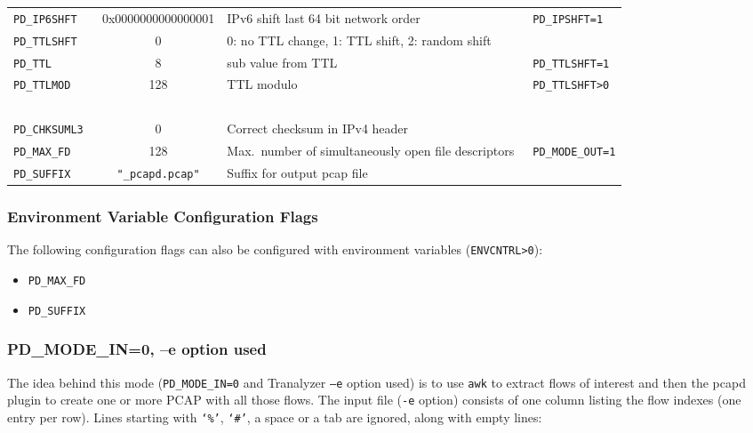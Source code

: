 \documentclass[documentation]{subfiles}
\begin{document}
\begin{longtable}{>{\tt}lcl>{\tt\small}l}
    PD\_IP6SHFT   & 0x0000000000000001 & IPv6 shift last 64 bit network order                                             & PD\_IPSHFT=1\\
    PD\_TTLSHFT   & 0                  & 0: no TTL change, 1: TTL shift, 2: random shift                                  & \\
    PD\_TTL       & 8                  & sub value from TTL                                                               & PD\_TTLSHFT=1\\
    PD\_TTLMOD    & 128                & TTL modulo                                                                       & PD\_TTLSHFT>0\\
                  &                    &                                                                                  & \\
    PD\_CHKSUML3  & 0                  & Correct checksum in IPv4 header                                                  & \\
    PD\_MAX\_FD   & 128                & Max.\ number of simultaneously open file descriptors                             & PD\_MODE\_OUT=1\\
    PD\_SUFFIX    & {\tt\small "\_pcapd.pcap"}
                                       & Suffix for output pcap file                                                      & \\
    \bottomrule
\end{longtable}

\subsubsection{Environment Variable Configuration Flags}
The following configuration flags can also be configured with environment variables ({\tt ENVCNTRL>0}):
\begin{itemize}
    \item {\tt PD\_MAX\_FD}
    \item {\tt PD\_SUFFIX}
\end{itemize}

\subsubsection{PD\_MODE\_IN=0, --e option used}\label{pcapdnormal}
The idea behind this mode ({\tt PD\_MODE\_IN=0} and Tranalyzer {\tt --e} option used) is to use {\tt awk} to extract flows of interest and then the pcapd plugin to create one or more PCAP with all those flows. The input file ({\tt -e} option) consists of one column listing the flow indexes (one entry per row). Lines starting with {\tt`\%'}, {\tt`\#'}, a space or a tab are ignored, along with empty lines:
\end{document}
